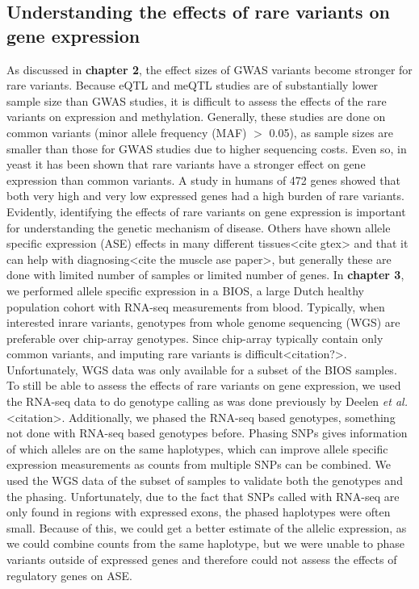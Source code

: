 \subsection{Understanding the effects of rare variants on gene expression}
As discussed in \textbf{chapter 2}, the effect sizes of GWAS variants become stronger for rare variants. Because eQTL and meQTL studies are of substantially lower sample size than GWAS studies, it is difficult to assess the effects of the rare variants on expression and methylation. Generally, these studies are done on common variants (minor allele frequency (MAF) $>$ 0.05), as sample sizes are smaller than those for GWAS studies due to higher sequencing costs. Even so, in yeast it has been shown that rare variants have a stronger effect on gene expression than common variants\cite{bloomRareVariantsContribute2019}. A study in humans of 472 genes showed that both very high and very low expressed genes had a high burden of rare variants\cite{zhaoBurdenRareVariants2016}. Evidently, identifying the effects of rare variants on gene expression is important for understanding the genetic mechanism of disease. Others have shown allele specific expression (ASE) effects in many different tissues<cite gtex> and that it can help with diagnosing<cite the muscle ase paper>, but generally these are done with limited number of samples or limited number of genes. In \textbf{chapter 3}, we performed allele specific expression in a BIOS, a large Dutch healthy population cohort with RNA-seq measurements from blood. Typically, when interested inrare variants, genotypes from whole genome sequencing (WGS) are preferable over chip-array genotypes. Since chip-array typically contain only common variants, and imputing rare variants is difficult<citation?>. Unfortunately, WGS data was only available for a subset of the BIOS samples. To still be able to assess the effects of rare variants on gene expression, we used the RNA-seq data to do genotype calling as was done previously by Deelen \emph{et al.}<citation>. Additionally, we phased the RNA-seq based genotypes, something not done with RNA-seq based genotypes before. Phasing SNPs gives information of which alleles are on the same haplotypes, which can improve allele specific expression measurements as counts from multiple SNPs can be combined. We used the WGS data of the subset of samples to validate both the genotypes and the phasing. Unfortunately, due to the fact that SNPs called with RNA-seq are only found in regions with expressed exons, the phased haplotypes were often small. Because of this, we could get a better estimate of the allelic expression, as we could combine counts from the same haplotype, but we were unable to phase variants outside of expressed genes and therefore could not assess the effects of regulatory genes on ASE.

